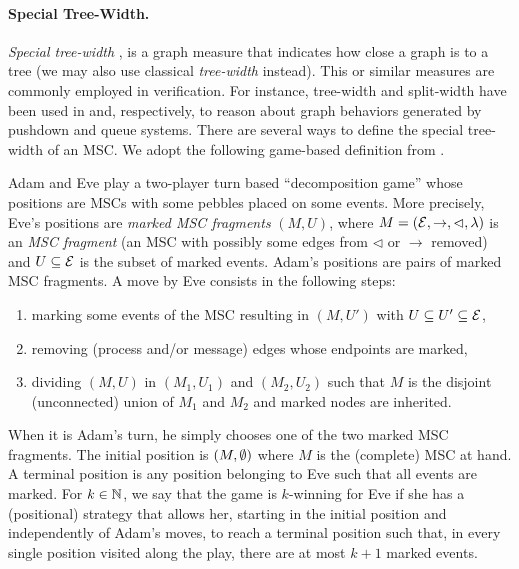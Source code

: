 \documentclass{article}
\begin{document}
\paragraph*{Special Tree-Width.}

\emph{Special tree-width} \cite{Courcelle10},
is a graph measure that indicates how close
a graph is to a tree (we may also use classical
	\emph{tree-width} instead).
This or similar measures are commonly employed in verification. For instance, tree-width and split-width have been used in \cite{MadhusudanP11} and, respectively, \cite{DBLP:conf/concur/CyriacGK12,AiswaryaGK14} to reason about graph behaviors generated by pushdown and queue systems.
There are several ways to define the special tree-width of an MSC.
We adopt the following game-based definition from \cite{DBLP:journals/corr/abs-1904-06942}.

Adam and Eve play a two-player turn based ``decomposition game''
whose positions
are MSCs with some pebbles placed on some events.
More precisely, Eve's positions are
\emph{marked MSC fragments} $(M, U)$, where
$M = (\mathcal{E}, \to, \lhd, \lambda)$
is an \emph{MSC fragment} (an MSC with possibly some edges from
$\lhd$ or $\to$ removed)
 and $U \subseteq \mathcal{E}$ is the subset of marked events.
Adam's positions are pairs of marked MSC fragments.
A move by Eve consists in the following steps:
\begin{enumerate}
	\item marking some events of the MSC resulting in $(M, U')$ with $U \subseteq U' \subseteq \mathcal{E}$,
	\item removing (process and/or message) edges whose endpoints are marked,
	\item dividing $(M, U)$ in $(M_1, U_1)$ and $(M_2, U_2)$ such that $M$ is the disjoint (unconnected) union of $M_1$ and $M_2$
	and marked nodes are inherited.
\end{enumerate}
When it is Adam's turn, he simply chooses one of the two marked MSC fragments.
The initial position is $(M,\emptyset)$ where $M$ is the (complete) MSC at hand. A terminal position is any position belonging to Eve such that all events are marked.
%
For $k \in \mathbb{N}$, we say that the game is $k$-winning for Eve if she has a (positional) strategy that allows her,
starting in the initial position and independently of Adam's moves, to reach a terminal position such that, in every single position visited along the play, there are at most $k+1$ marked events.

\newcommand{\CS}[2]{\mathsf{CS}_{(#1,#2)}}
\newcommand{\MSO}[2]{\mathsf{MSO}_{(#1,#2)}}
\newcommand{\LCPDL}[2]{\mathsf{LCPDL}_{(#1,#2)}}
\newcommand{\MSCpm}[2]{\mathsf{MSC}_{(#1,#2)}}
\newcommand{\mbMSCpm}[2]{\mathsf{MSC}_{(#1,#2)}^{\mathsf{mb}}}
\end{document}
